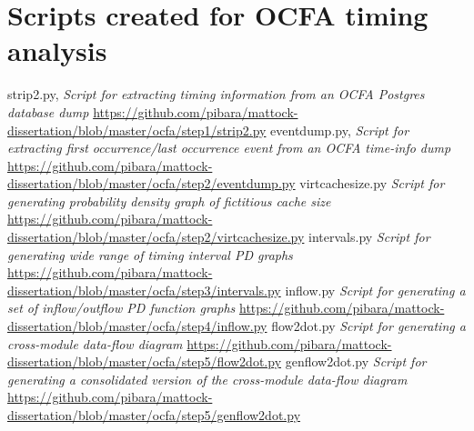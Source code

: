 \chapter{Scripts created for OCFA timing analysis}
\noindent 
\renewcommand{\bibname}{Scripts}
\begin{thebibliography}{1}
 strip2.py, {\em Script for extracting timing information from an OCFA  Postgres database dump}  \url{https://github.com/pibara/mattock-dissertation/blob/master/ocfa/step1/strip2.py}
 eventdump.py, {\em Script for extracting first occurrence/last occurrence event from an OCFA time-info dump} \url{https://github.com/pibara/mattock-dissertation/blob/master/ocfa/step2/eventdump.py}
 virtcachesize.py {\em Script for generating probability density graph of fictitious cache size}  \url{https://github.com/pibara/mattock-dissertation/blob/master/ocfa/step2/virtcachesize.py}
 intervals.py {\em Script for generating wide range of timing interval PD graphs}  \url{https://github.com/pibara/mattock-dissertation/blob/master/ocfa/step3/intervals.py}
 inflow.py {\em Script for generating a set of inflow/outflow PD function graphs}  \url{https://github.com/pibara/mattock-dissertation/blob/master/ocfa/step4/inflow.py}
 flow2dot.py {\em Script for generating a cross-module data-flow diagram} \url{https://github.com/pibara/mattock-dissertation/blob/master/ocfa/step5/flow2dot.py}
 genflow2dot.py {\em Script for generating a consolidated version of the cross-module data-flow diagram}  \url{https://github.com/pibara/mattock-dissertation/blob/master/ocfa/step5/genflow2dot.py}
\end{thebibliography}
